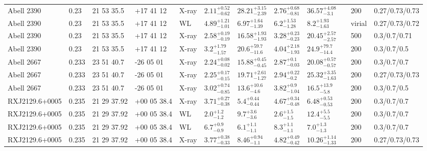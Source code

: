\begin{landscape}
\begin{center}
{\begin{longtable}{llllllllllll}
Abell 2390 & 0.23 & 21 53 35.5 & +17 41 12 & X-ray & ${2.11}^{+0.52}_{-0.62}$ & ${28.21}^{+3.15}_{-2.39}$ & ${2.76}^{+0.68}_{-0.81}$ & ${36.57}^{+4.08}_{-3.1}$ & \citet{BA14.1} & 200 & 0.27/0.73/0.73 \\
Abell 2390 & 0.23 & 21 53 35.5 & +17 41 12 & WL & ${4.89}^{+1.21}_{-1.01}$ & ${6.97}^{+1.64}_{-1.39}$ & ${6.2}^{+1.53}_{-1.28}$ & ${8.2}^{+1.93}_{-1.63}$ & \citet{OK10.1} & virial & 0.27/0.73/0.72 \\
Abell 2390 & 0.23 & 21 53 35.5 & +17 41 12 & X-ray & ${2.58}^{+0.19}_{-0.19}$ & ${16.58}^{+1.93}_{-1.93}$ & ${3.28}^{+0.23}_{-0.23}$ & ${20.45}^{+2.57}_{-2.57}$ & \citet{VI06.1} & 500 & 0.3/0.7/0.71 \\
Abell 2390 & 0.23 & 21 53 35.5 & +17 41 12 & X-ray & ${3.2}^{+1.79}_{-1.57}$ & ${20.6}^{+59.7}_{-11.6}$ & ${4.04}^{+2.18}_{-1.93}$ & ${24.9}^{+79.7}_{-14.4}$ & \citet{AL03.1} & 200 & 0.3/0.7/0.5 \\
Abell 2667 & 0.233 & 23 51 40.7 & -26 05 01 & X-ray & ${2.24}^{+0.08}_{-0.02}$ & ${15.88}^{+0.45}_{-0.45}$ & ${2.87}^{+0.1}_{-0.03}$ & ${20.08}^{+0.57}_{-0.57}$ & \citet{ET11.1} & 200 & 0.3/0.7/0.7 \\
Abell 2667 & 0.233 & 23 51 40.7 & -26 05 01 & X-ray & ${2.25}^{+0.17}_{-0.15}$ & ${19.71}^{+2.61}_{-1.27}$ & ${2.94}^{+0.22}_{-0.2}$ & ${25.32}^{+3.35}_{-1.63}$ & \citet{BA14.1} & 200 & 0.27/0.73/0.73 \\
Abell 2667 & 0.233 & 23 51 40.7 & -26 05 01 & X-ray & ${3.02}^{+0.74}_{-0.85}$ & ${13.6}^{+10.6}_{-4.6}$ & ${3.82}^{+0.9}_{-1.04}$ & ${16.5}^{+13.9}_{-5.8}$ & \citet{AL03.1} & 200 & 0.3/0.7/0.5 \\
RXJ2129.6+0005 & 0.235 & 21 29 37.92 & +00 05 38.4 & X-ray & ${3.71}^{+0.27}_{-0.38}$ & ${5.4}^{+0.44}_{-0.44}$ & ${4.67}^{+0.34}_{-0.48}$ & ${6.48}^{+0.53}_{-0.53}$ & \citet{ET11.1} & 200 & 0.3/0.7/0.7 \\
RXJ2129.6+0005 & 0.235 & 21 29 37.92 & +00 05 38.4 & WL & ${2.0}^{+1.2}_{-1.2}$ & ${9.7}^{+3.6}_{-3.6}$ & ${2.6}^{+1.5}_{-1.5}$ & ${12.4}^{+5.5}_{-5.5}$ & \citet{SE14.1} & 200 & 0.3/0.7/0.7 \\
RXJ2129.6+0005 & 0.235 & 21 29 37.92 & +00 05 38.4 & WL & ${6.7}^{+0.9}_{-0.9}$ & ${6.1}^{+1.1}_{-1.1}$ & ${8.3}^{+1.1}_{-1.1}$ & ${7.0}^{+1.3}_{-1.3}$ & \citet{SE14.1} & 200 & 0.3/0.7/0.7 \\
RXJ2129.6+0005 & 0.235 & 21 29 37.92 & +00 05 38.4 & X-ray & ${3.77}^{+0.38}_{-0.33}$ & ${8.46}^{+0.94}_{-1.1}$ & ${4.82}^{+0.49}_{-0.42}$ & ${10.26}^{+1.14}_{-1.33}$ & \citet{BA14.1} & 200 & 0.27/0.73/0.73 \\

\end{longtable}}
\end{center}
\end{landscape}
